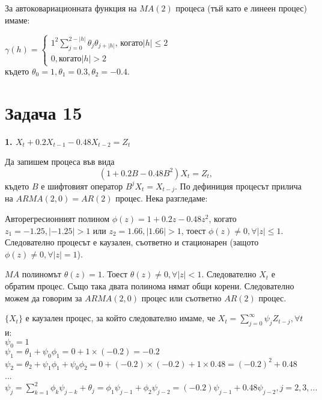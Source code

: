 \documentclass{article}
\begin{document}
\begin{flushleft}
\begin{flushleft}
\begin{flushleft}
За автоковариационната функция на $MA(2)$ процеса (тъй като е линеен процес) имаме:

$
  \gamma(h) =
    \begin{cases}
      1^2 \sum_{j=0}^{2 - |h|} \theta_j \theta_{j+|h|}\text{, когато} |h| \leq 2 \\
      0, \text{когато} |h| > 2
    \end{cases}       
$ \\
където $\theta_0 = 1, \theta_1 = 0.3, \theta_2 = -0.4$.
\end{flushleft}
\end{flushleft}

\section*{Задача 15}

\textbf{1. $X_t + 0.2X_{t-1} - 0.48X_{t-2} = Z_t$}
\begin{flushleft}
Да запишем процеса във вида $$(1 + 0.2B - 0.48B^2)X_t = Z_t,$$ където $B$ е шифтовият оператор $B^j X_t = X_{t-j}$. По дефиниция процесът прилича на $ARMA(2, 0) = AR(2)$ процес. Нека разгледаме:

\begin{flushleft}
Авторегресионният полином $\phi(z) = 1 + 0.2z - 0.48z^2$, когато $z_1 = -1.25, |-1.25| > 1$ или $z_2 = 1.66, |1.66| > 1$, тоест $\phi(z) \neq 0, \forall |z| \leq 1$. Следователно процесът е каузален, съответно и стационарен (защото $\phi(z) \neq 0, \forall |z| = 1$).
\end{flushleft}

\begin{flushleft}
$MA$ полиномът $\theta(z) = 1$. Тоест $\theta(z) \neq 0, \forall |z| < 1$. Следователно $X_t$ е обратим процес. Също така двата полинома нямат общи корени. Следователно можем да говорим за $ARMA(2, 0)$ процес или съответно $AR(2)$ процес.
\end{flushleft}

\begin{flushleft}
$\{X_t \}$ е каузален процес, за който следователно имаме, че $X_t = \sum_{j=0}^{\infty}\psi_jZ_{t-j}, \forall t$ и: \\
$\psi_0 = 1$ \\
$\psi_1 = \theta_1 + \psi_0 \phi_1 = 0 + 1 \times (-0.2) = -0.2$ \\
$\psi_2 = \theta_2 + \psi_1 \phi_1 + \psi_0 \phi_2 = 0 + (-0.2) \times (-0.2) + 1 \times 0.48 = (-0.2)^2 + 0.48$ \\
... \\
$\psi_j = \sum_{k=1}^{2} \phi_k \psi_{j-k} + \theta_j = \phi_1 \psi_{j-1} + \phi_2 \psi_{j-2} = (-0.2)\psi_{j-1} + 0.48\psi_{j-2}, j = 2, 3, ...$ \\
\end{flushleft}

\end{flushleft}

\end{flushleft}
\end{document}
